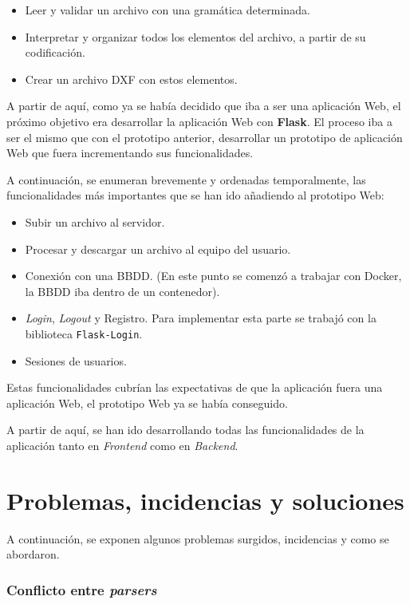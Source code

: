 \begin{itemize}
\item Leer y validar un archivo con una gramática determinada.
\item Interpretar y organizar todos los elementos del archivo, a partir de su codificación.
\item Crear un archivo DXF con estos elementos.
\end{itemize}

A partir de aquí, como ya se había decidido que iba a ser una aplicación Web, el próximo objetivo era desarrollar la aplicación Web con \textbf{Flask}. El proceso iba a ser el mismo que con el prototipo anterior, desarrollar un prototipo de aplicación Web que fuera incrementando sus funcionalidades.

A continuación, se enumeran brevemente y ordenadas temporalmente, las funcionalidades más importantes que se han ido añadiendo al prototipo Web:
\begin{itemize}
\item Subir un archivo al servidor.
\item Procesar y descargar un archivo al equipo del usuario.
\item Conexión con una BBDD. (En este punto se comenzó a trabajar con Docker, la BBDD iba dentro de un contenedor).
\item \emph{Login}, \emph{Logout} y Registro. Para implementar esta parte se trabajó con la biblioteca \texttt{Flask-Login}.
\item Sesiones de usuarios. 
\end{itemize}

Estas funcionalidades cubrían las expectativas de que la aplicación fuera una aplicación Web, el prototipo Web ya se había conseguido.

A partir de aquí, se han ido desarrollando todas las funcionalidades de la aplicación tanto en \emph{Frontend} como en  \emph{Backend}.

\section{Problemas, incidencias y soluciones}

A continuación, se exponen algunos  problemas surgidos, incidencias y como se abordaron.


\subsubsection{Conflicto entre \emph{parsers}}

